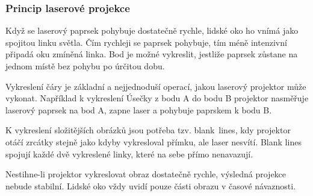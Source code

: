 
\subsubsection{Princip laserové projekce}
Když se laserový paprsek pohybuje dostatečně rychle, lidské oko ho vnímá jako spojitou linku světla.
Čím rychleji se paprsek pohybuje, tím méně intenzivní připadá oku zmíněná linka. Bod je možné vykreslit, jestliže paprsek zůstane na jednom místě bez pohybu po úrčitou dobu.

Vykreslení čáry je základní a nejjednoduší operací, jakou laserový projektor může vykonat. Například k vykreslení Úsečky z bodu A do bodu B projektor nasměřuje laserový paprsek na bod A, zapne laser a pohybuje paprskem k bodu B.

K vykreslení složitějších obrázků jsou potřeba tzv. blank\ lines, kdy projektor otáčí zrcátky stejně jako kdyby vykresloval přímku, ale laser nesvítí. Blank lines spojují každé dvě vykreslené linky, které na sebe přímo nenavazují.

Nestihne-li projektor vykreslovat obraz dostatečně rychle, výsledná projekce nebude stabilní. Lidské oko vždy uvidí pouze části obrazu v časové návaznosti.

